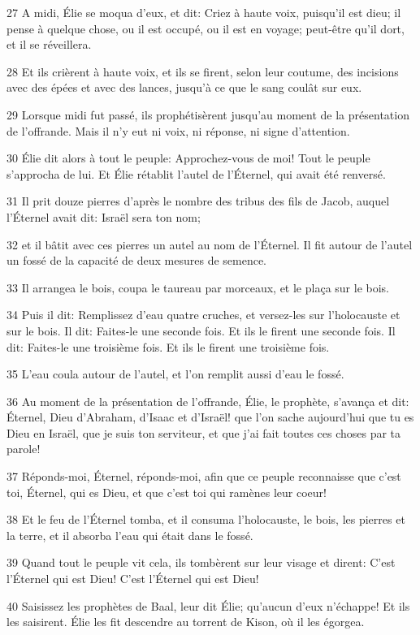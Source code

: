 \par 27 A midi, Élie se moqua d'eux, et dit: Criez à haute voix, puisqu'il est dieu; il pense à quelque chose, ou il est occupé, ou il est en voyage; peut-être qu'il dort, et il se réveillera.
\par 28 Et ils crièrent à haute voix, et ils se firent, selon leur coutume, des incisions avec des épées et avec des lances, jusqu'à ce que le sang coulât sur eux.
\par 29 Lorsque midi fut passé, ils prophétisèrent jusqu'au moment de la présentation de l'offrande. Mais il n'y eut ni voix, ni réponse, ni signe d'attention.
\par 30 Élie dit alors à tout le peuple: Approchez-vous de moi! Tout le peuple s'approcha de lui. Et Élie rétablit l'autel de l'Éternel, qui avait été renversé.
\par 31 Il prit douze pierres d'après le nombre des tribus des fils de Jacob, auquel l'Éternel avait dit: Israël sera ton nom;
\par 32 et il bâtit avec ces pierres un autel au nom de l'Éternel. Il fit autour de l'autel un fossé de la capacité de deux mesures de semence.
\par 33 Il arrangea le bois, coupa le taureau par morceaux, et le plaça sur le bois.
\par 34 Puis il dit: Remplissez d'eau quatre cruches, et versez-les sur l'holocauste et sur le bois. Il dit: Faites-le une seconde fois. Et ils le firent une seconde fois. Il dit: Faites-le une troisième fois. Et ils le firent une troisième fois.
\par 35 L'eau coula autour de l'autel, et l'on remplit aussi d'eau le fossé.
\par 36 Au moment de la présentation de l'offrande, Élie, le prophète, s'avança et dit: Éternel, Dieu d'Abraham, d'Isaac et d'Israël! que l'on sache aujourd'hui que tu es Dieu en Israël, que je suis ton serviteur, et que j'ai fait toutes ces choses par ta parole!
\par 37 Réponds-moi, Éternel, réponds-moi, afin que ce peuple reconnaisse que c'est toi, Éternel, qui es Dieu, et que c'est toi qui ramènes leur coeur!
\par 38 Et le feu de l'Éternel tomba, et il consuma l'holocauste, le bois, les pierres et la terre, et il absorba l'eau qui était dans le fossé.
\par 39 Quand tout le peuple vit cela, ils tombèrent sur leur visage et dirent: C'est l'Éternel qui est Dieu! C'est l'Éternel qui est Dieu!
\par 40 Saisissez les prophètes de Baal, leur dit Élie; qu'aucun d'eux n'échappe! Et ils les saisirent. Élie les fit descendre au torrent de Kison, où il les égorgea.
